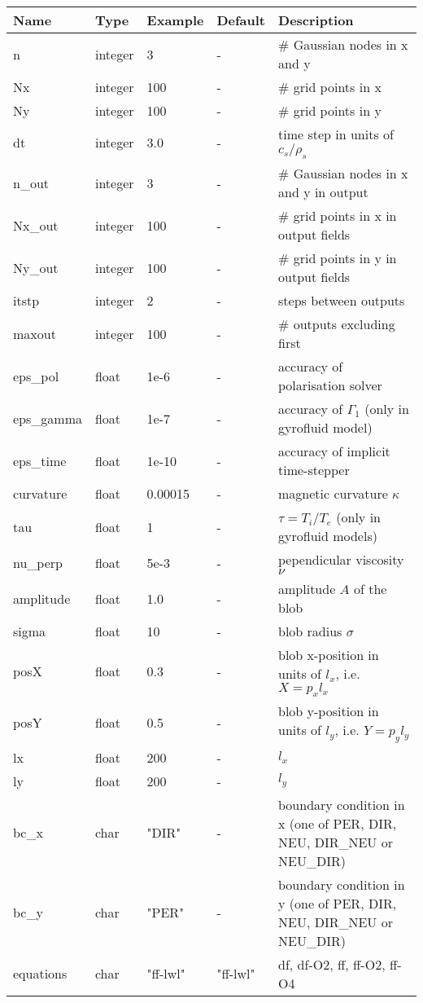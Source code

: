 \begin{longtable}{llll>{\RaggedRight}p{7cm}}
\toprule
\rowcolor{gray!50}\textbf{Name} &  \textbf{Type} & \textbf{Example} & \textbf{Default} & \textbf{Description}  \\ \midrule
n      & integer & 3 & - &\# Gaussian nodes in x and y \\
Nx     & integer &100& - &\# grid points in x \\
Ny     & integer &100& - &\# grid points in y \\
dt     & integer &3.0& - &time step in units of $c_s/\rho_s$ \\
n\_out  & integer &3  & - &\# Gaussian nodes in x and y in output \\
Nx\_out & integer &100& - &\# grid points in x in output fields \\
Ny\_out & integer &100& - &\# grid points in y in output fields \\
itstp  & integer &2  & - &   steps between outputs \\
maxout & integer &100& - &      \# outputs excluding first \\
eps\_pol   & float &1e-6    & - &  accuracy of polarisation solver \\
eps\_gamma & float &1e-7    & - & accuracy of $\Gamma_1$ (only in gyrofluid model) \\
eps\_time  & float &1e-10   & - & accuracy of implicit time-stepper \\
curvature  & float &0.00015& - & magnetic curvature $\kappa$ \\
tau        & float &1      & - & $\tau = T_i/T_e$ (only in gyrofluid models) \\
nu\_perp    & float &5e-3   & - & pependicular viscosity $\nu$ \\
amplitude  & float &1.0    & - & amplitude $A$ of the blob \\
sigma      & float &10     & - & blob radius $\sigma$ \\
posX       & float &0.3    & - & blob x-position in units of $l_x$, i.e. $X = p_x l_x$\\
posY       & float &0.5    & - & blob y-position in units of $l_y$, i.e. $Y = p_y l_y$ \\
lx         & float &200    & - & $l_x$  \\
ly         & float &200    & - & $l_y$  \\
bc\_x   & char & "DIR"      & - & boundary condition in x (one of PER, DIR, NEU, DIR\_NEU or NEU\_DIR) \\
bc\_y   & char & "PER"      & - & boundary condition in y (one of PER, DIR, NEU, DIR\_NEU or NEU\_DIR) \\
equations  & char & "ff-lwl" & "ff-lwl" &df, df-O2, ff, ff-O2, ff-O4\\
\bottomrule
\end{longtable}

